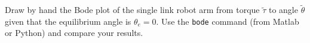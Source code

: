
Draw by hand the Bode plot of the single link robot arm from torque $\tilde{\tau}$ to angle $\tilde{\theta}$ given that the equilibrium angle is $\theta_e=0$.  Use the \texttt{bode} command (from Matlab or Python) and compare your results.
